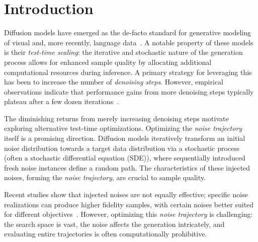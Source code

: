 \documentclass{article}
\begin{document}
\section{Introduction}
\label{introduction}
%
Diffusion models have emerged as the de-facto standard for generative modeling of visual and, more recently, language data~\citep{ho2020denoisingdiffusionprobabilisticmodels, sohldickstein2015deepunsupervisedlearningusing,nie2025largelanguagediffusionmodels}. A notable property of these models is their \textit{test-time scaling}: the iterative and stochastic nature of the generation process allows for enhanced sample quality by allocating additional computational resources during inference. A primary strategy for leveraging this has been to increase the number of \textit{denoising steps}. However, empirical observations indicate that performance gains from more denoising steps typically plateau after a few dozen iterations~\citep{karras2022elucidatingdesignspacediffusionbased, song2022denoisingdiffusionimplicitmodels, song2021scorebasedgenerativemodelingstochastic}.


The diminishing returns from merely increasing denoising steps motivate exploring alternative test-time optimizations. Optimizing the \textit{noise trajectory} itself is a promising direction. Diffusion models iteratively transform an initial noise distribution towards a target data distribution via a stochastic process (often a stochastic differential equation (SDE)), where sequentially introduced fresh noise instances define a random path. 
The characteristics of these injected noises, forming the \textit{noise trajectory}, are crucial to sample quality.

Recent studies show that injected noises are not equally effective; specific noise realizations can produce higher fidelity samples, with certain noises better suited for different objectives~\citep{qi2024noisescreatedequallydiffusionnoise, ahn2024noiseworthdiffusionguidance}. However, optimizing this \textit{noise trajectory} is challenging: the search space is vast, the noise affects the generation intricately, and evaluating entire trajectories is often computationally prohibitive.
\end{document}

